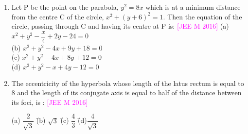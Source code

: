 \documentclass[journal,12pt,twocolumn]{IEEEtran}
\theoremstyle{remark}
\begin{document}
\begin{enumerate}[label=\textcolor{magenta}{\arabic*.}]
    \hfill{\textcolor{magenta}{[JEE M 2015]}}
    \begin{tabbing}
        (a) $\dfrac{27}{2}$ \hspace{2em} \= (b) $27$ \hspace{2em} \= (c) $\dfrac{27}{4}$ \hspace{2em} \= (d) 18 \\
    \end{tabbing}
    \item Let P be the point on the parabola, $y^2=8x$ which is at a minimum distance from the centre C of the circle, $x^2+(y+6)^2=1$. Then the equation of the circle, passing through C and having its centre at P is:
    \hfill{\textcolor{magenta}{[JEE M 2016]}}
    (a) $x^2+y^2-\dfrac{x}{4}+2y-24=0$\\
    (b) $x^2+y^2-4x+9y+18=0$\\
    (c) $x^2+y^2-4x+8y+12=0$\\
    (d) $x^2+y^2-x+4y-12=0$\\
    \item The eccentricity of the hyperbola whose length of the latus rectum is equal to 8 and the length of its conjugate axis is equal to half of the distance between its foci, is :
    \hfill{\textcolor{magenta}{[JEE M 2016]}}
    \begin{tabbing}
        (a) $\dfrac{2}{\sqrt{3}}$ \hspace{2em} \= (b) $\sqrt{3}$ \hspace{2em} \= (c) $\dfrac{4}{3}$ \hspace{2em} \= (d)$\dfrac{4}{\sqrt{3}}$\\
    \end{tabbing}
    
\end{enumerate}
\end{document}
